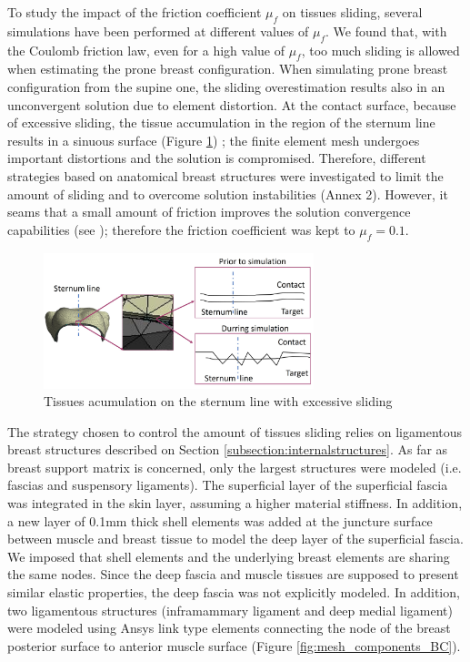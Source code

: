 To study the impact of the friction coefficient $\mu_f$ on tissues sliding, several simulations have been performed at different values of $\mu_f$. We found that, with the Coulomb friction law, even for a high value of $\mu_f$, too much sliding is allowed when estimating the prone breast configuration. When simulating prone breast configuration from the supine one, the sliding overestimation results also in an unconvergent solution due to element distortion. At the contact surface, because of excessive sliding, the tissue accumulation in the region of the sternum line results in a sinuous surface (Figure \ref{fig:overslidingProblem}) ; the finite element mesh  undergoes important distortions and the solution is compromised. Therefore, different strategies based on anatomical breast structures were investigated to limit the amount of sliding and to overcome solution instabilities (Annex 2). However, it seams that a small amount of friction improves the solution convergence capabilities (see \cite{ansys_contact_2017}); therefore the friction coefficient was kept to $\mu_f = 0.1$. 
\begin{figure}[!h]
\centering
\includegraphics[width=0.7\textwidth,keepaspectratio]{figures/overslidingProblem.jpg} 
\caption{Tissues acumulation on the sternum line with excessive sliding}\label{fig:overslidingProblem}
\end{figure}
 
The strategy chosen to control the amount of tissues sliding relies on ligamentous breast structures described on Section \ref{subsection:internalstructures}. As far as  breast support matrix is concerned, only the largest structures were modeled (i.e. fascias and suspensory ligaments).  The superficial layer of the superficial fascia was integrated in the skin layer, assuming a higher material stiffness. In addition, a new layer of 0.1mm thick shell elements was added at the juncture surface between muscle and breast tissue to model the deep layer of the superficial fascia. We imposed that shell elements and the underlying breast elements are sharing the same nodes. Since the deep fascia and muscle tissues are supposed to present similar elastic properties, the deep fascia was not explicitly modeled. In addition, two ligamentous structures (inframammary ligament and deep medial ligament) were modeled using Ansys link type elements connecting the node of the breast posterior surface to anterior muscle surface (Figure \ref{fig:mesh_components_BC}).  



